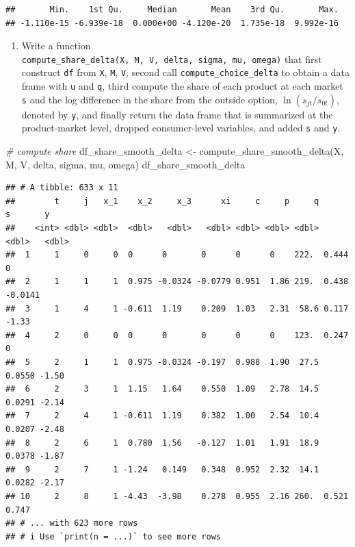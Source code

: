 \documentclass[
]{book}
\newenvironment{Shaded}{\begin{snugshade}}{\end{snugshade}}
\newcommand{\CommentTok}[1]{\textcolor[rgb]{0.56,0.35,0.01}{\textit{#1}}}
\newcommand{\FunctionTok}[1]{\textcolor[rgb]{0.00,0.00,0.00}{#1}}
\newcommand{\NormalTok}[1]{#1}
\newcommand{\OtherTok}[1]{\textcolor[rgb]{0.56,0.35,0.01}{#1}}
\providecommand{\tightlist}{%
  \setlength{\itemsep}{0pt}\setlength{\parskip}{0pt}}
\begin{document}
\begin{verbatim}
##       Min.    1st Qu.     Median       Mean    3rd Qu.       Max. 
## -1.110e-15 -6.939e-18  0.000e+00 -4.120e-20  1.735e-18  9.992e-16
\end{verbatim}

\begin{enumerate}
\def\labelenumi{\arabic{enumi}.}
\setcounter{enumi}{6}
\tightlist
\item
  Write a function \texttt{compute\_share\_delta(X,\ M,\ V,\ delta,\ sigma,\ mu,\ omega)} that first construct \texttt{df} from \texttt{X}, \texttt{M}, \texttt{V}, second call \texttt{compute\_choice\_delta} to obtain a data frame with \texttt{u} and \texttt{q}, third compute the share of each product at each market \texttt{s} and the log difference in the share from the outside option, \(\ln(s_{jt}/s_{0t})\), denoted by \texttt{y}, and finally return the data frame that is summarized at the product-market level, dropped consumer-level variables, and added \texttt{s} and \texttt{y}.
\end{enumerate}

\begin{Shaded}
\begin{Highlighting}[]
\CommentTok{\# compute share}
\NormalTok{df\_share\_smooth\_delta }\OtherTok{\textless{}{-}}
  \FunctionTok{compute\_share\_smooth\_delta}\NormalTok{(X, M, V, delta, sigma, mu, omega) }
\NormalTok{df\_share\_smooth\_delta}
\end{Highlighting}
\end{Shaded}

\begin{verbatim}
## # A tibble: 633 x 11
##        t     j   x_1    x_2     x_3      xi     c     p     q      s       y
##    <int> <dbl> <dbl>  <dbl>   <dbl>   <dbl> <dbl> <dbl> <dbl>  <dbl>   <dbl>
##  1     1     0     0  0      0       0      0      0    222.  0.444   0     
##  2     1     1     1  0.975 -0.0324 -0.0779 0.951  1.86 219.  0.438  -0.0141
##  3     1     4     1 -0.611  1.19    0.209  1.03   2.31  58.6 0.117  -1.33  
##  4     2     0     0  0      0       0      0      0    123.  0.247   0     
##  5     2     1     1  0.975 -0.0324 -0.197  0.988  1.90  27.5 0.0550 -1.50  
##  6     2     3     1  1.15   1.64    0.550  1.09   2.78  14.5 0.0291 -2.14  
##  7     2     4     1 -0.611  1.19    0.382  1.00   2.54  10.4 0.0207 -2.48  
##  8     2     6     1  0.780  1.56   -0.127  1.01   1.91  18.9 0.0378 -1.87  
##  9     2     7     1 -1.24   0.149   0.348  0.952  2.32  14.1 0.0282 -2.17  
## 10     2     8     1 -4.43  -3.98    0.278  0.955  2.16 260.  0.521   0.747 
## # ... with 623 more rows
## # i Use `print(n = ...)` to see more rows
\end{verbatim}
\end{document}
